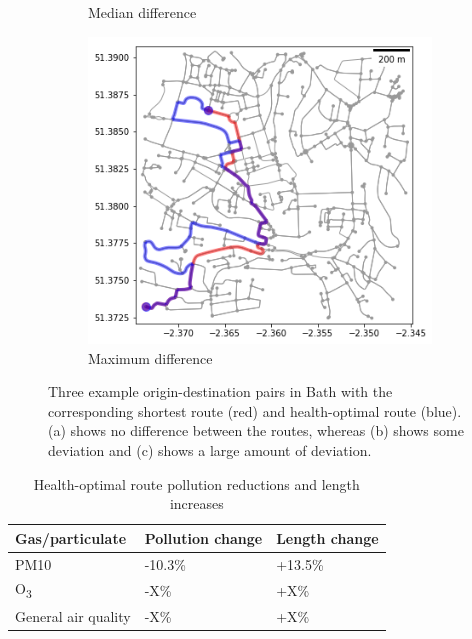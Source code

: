 \documentclass[11pt]{report}
\begin{document}
\begin{figure}[!tb]
\begin{minipage}{1\linewidth}
\begin{subfigure}[t]{.5\linewidth}
            	\caption{Median difference}
            	\label{fig:route_median}
	   \end{subfigure}
        \end{minipage}
    \begin{minipage}{1\linewidth}
    	\centering
        \begin{subfigure}[t]{.5\linewidth}
            \includegraphics[width=\textwidth]{images/health_optimal_route_max}
            \caption{Maximum difference}
            \label{fig:route_max}
        \end{subfigure}
    \end{minipage}
    \caption{Three example origin-destination pairs in Bath with the corresponding shortest route (red) and health-optimal route (blue). (a) shows no difference between the routes, whereas (b) shows some deviation and (c) shows a large amount of deviation.}
    \label{fig:origdestpairs}
\end{figure}

\begin{table}[!tbp]
  \centering
  \caption{Health-optimal route pollution reductions and length increases}
  \label{tab:pollution_reductions}
  \begin{tabular}{ l l l }
  \toprule
  Gas/particulate & Pollution change & Length change \\ \midrule
  PM10 & -10.3\% & +13.5\% \\
  O\textsubscript{3} & -X\% & +X\% \\
  General air quality & -X\% & +X\% \\ \bottomrule
  \end{tabular}
\end{table}
\end{document}
